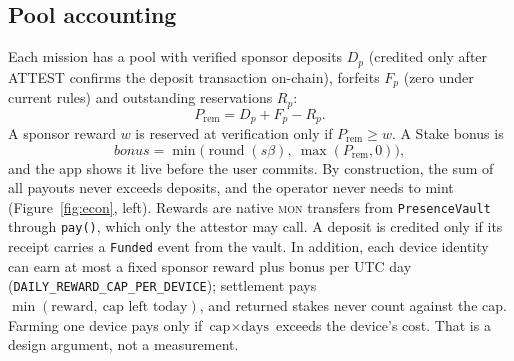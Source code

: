 \documentclass[10pt]{article}
\newcommand{\code}[1]{\texttt{\small #1}}
\newcommand{\mon}{\textsc{mon}}
\begin{document}
\subsection{Pool accounting}
Each mission has a pool with verified sponsor deposits $D_p$ (credited only after ATTEST confirms the deposit
transaction on-chain), forfeits $F_p$ (zero under current rules) and outstanding reservations $R_p$:
\begin{equation}
P_{\text{rem}} = D_p + F_p - R_p .
\end{equation}
A sponsor reward $w$ is reserved at verification only if $P_{\text{rem}}\ge w$. A Stake bonus is
\begin{equation}\label{eq:bonus}
\textit{bonus}=\min\!\big(\operatorname{round}(s\beta),\ \max(P_{\text{rem}},0)\big),
\end{equation}
and the app shows it live before the user commits. By construction, the sum of all payouts never exceeds deposits, and
the operator never needs to mint (Figure~\ref{fig:econ}, left). Rewards are native \mon{} transfers from
\code{PresenceVault} through \code{pay()}, which only the attestor may call. A deposit is credited only if its receipt
carries a \code{Funded} event from the vault. In addition, each device identity can earn at most a fixed sponsor reward
plus bonus per UTC day (\code{DAILY\_REWARD\_CAP\_PER\_DEVICE}); settlement pays $\min(\text{reward},\ \text{cap left
today})$, and returned stakes never count against the cap. Farming one device pays only if $\text{cap}\times\text{days}$
exceeds the device's cost. That is a design argument, not a measurement.
\end{document}
